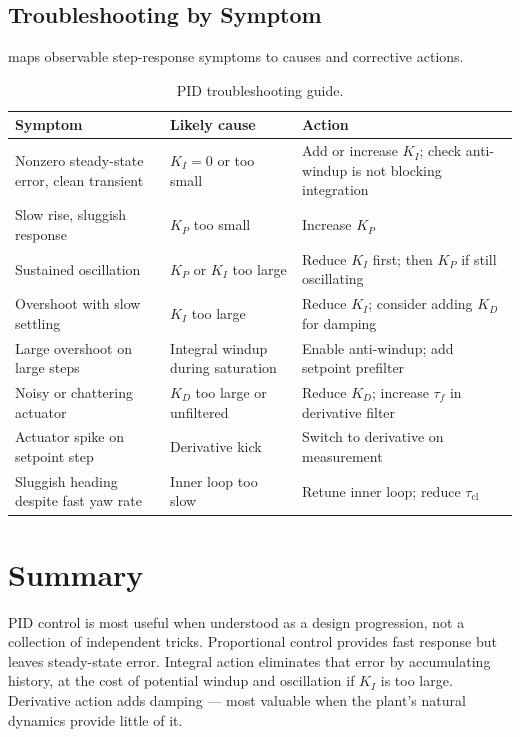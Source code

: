 \documentclass[12pt]{article}
\begin{document}
\subsection{Troubleshooting by Symptom}

 maps observable step-response symptoms to causes and
corrective actions.

\begin{table}[htbp]
\centering
\caption{PID troubleshooting guide.}
\label{tab:troubleshoot}
\begin{tabular}{p{4cm}p{3.5cm}p{5cm}}
\toprule
Symptom & Likely cause & Action \\
\midrule
Nonzero steady-state error, clean transient
  & $K_I = 0$ or too small
  & Add or increase $K_I$; check anti-windup is not blocking integration \\[4pt]
Slow rise, sluggish response
  & $K_P$ too small
  & Increase $K_P$ \\[4pt]
Sustained oscillation
  & $K_P$ or $K_I$ too large
  & Reduce $K_I$ first; then $K_P$ if still oscillating \\[4pt]
Overshoot with slow settling
  & $K_I$ too large
  & Reduce $K_I$; consider adding $K_D$ for damping \\[4pt]
Large overshoot on large steps
  & Integral windup during saturation
  & Enable anti-windup; add setpoint prefilter \\[4pt]
Noisy or chattering actuator
  & $K_D$ too large or unfiltered
  & Reduce $K_D$; increase $\tau_f$ in derivative filter \\[4pt]
Actuator spike on setpoint step
  & Derivative kick
  & Switch to derivative on measurement \\[4pt]
Sluggish heading despite fast yaw rate
  & Inner loop too slow
  & Retune inner loop; reduce $\tau_\mathrm{cl}$ \\
\bottomrule
\end{tabular}
\end{table}


\section{Summary}
\label{sec:summary}

PID control is most useful when understood as a design progression, not a
collection of independent tricks.  Proportional control provides fast response
but leaves steady-state error.  Integral action eliminates that error by
accumulating history, at the cost of potential windup and oscillation if
$K_I$ is too large.  Derivative action adds damping --- most valuable when the
plant's natural dynamics provide little of it.
\end{document}
